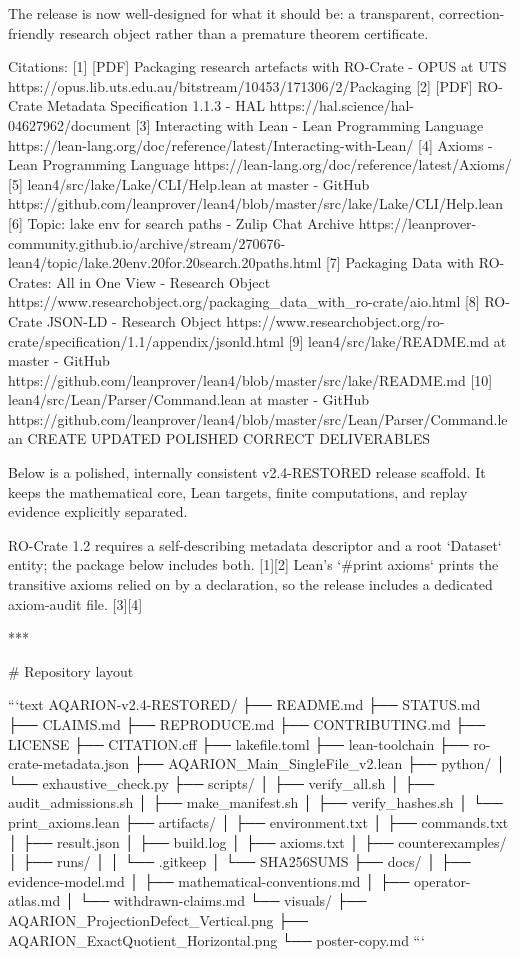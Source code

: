 The release is now well-designed for what it should be: a transparent, correction-friendly research object rather than a premature theorem certificate.

Citations:
[1] [PDF] Packaging research artefacts with RO-Crate - OPUS at UTS https://opus.lib.uts.edu.au/bitstream/10453/171306/2/Packaging%
[2] [PDF] RO-Crate Metadata Specification 1.1.3 - HAL https://hal.science/hal-04627962/document
[3] Interacting with Lean - Lean Programming Language https://lean-lang.org/doc/reference/latest/Interacting-with-Lean/
[4] Axioms - Lean Programming Language https://lean-lang.org/doc/reference/latest/Axioms/
[5] lean4/src/lake/Lake/CLI/Help.lean at master - GitHub https://github.com/leanprover/lean4/blob/master/src/lake/Lake/CLI/Help.lean
[6] Topic: lake env for search paths - Zulip Chat Archive https://leanprover-community.github.io/archive/stream/270676-lean4/topic/lake.20env.20for.20search.20paths.html
[7] Packaging Data with RO-Crates: All in One View - Research Object https://www.researchobject.org/packaging_data_with_ro-crate/aio.html
[8] RO-Crate JSON-LD - Research Object https://www.researchobject.org/ro-crate/specification/1.1/appendix/jsonld.html
[9] lean4/src/lake/README.md at master - GitHub https://github.com/leanprover/lean4/blob/master/src/lake/README.md
[10] lean4/src/Lean/Parser/Command.lean at master - GitHub https://github.com/leanprover/lean4/blob/master/src/Lean/Parser/Command.lean
CREATE UPDATED POLISHED CORRECT DELIVERABLES

Below is a polished, internally consistent v2.4-RESTORED release scaffold. It keeps the mathematical core, Lean targets, finite computations, and replay evidence explicitly separated.

RO-Crate 1.2 requires a self-describing metadata descriptor and a root `Dataset` entity; the package below includes both. [1][2] Lean’s `#print axioms` prints the transitive axioms relied on by a declaration, so the release includes a dedicated axiom-audit file. [3][4]

***

# Repository layout

```text
AQARION-v2.4-RESTORED/
├── README.md
├── STATUS.md
├── CLAIMS.md
├── REPRODUCE.md
├── CONTRIBUTING.md
├── LICENSE
├── CITATION.cff
├── lakefile.toml
├── lean-toolchain
├── ro-crate-metadata.json
├── AQARION_Main_SingleFile_v2.lean
├── python/
│   └── exhaustive_check.py
├── scripts/
│   ├── verify_all.sh
│   ├── audit_admissions.sh
│   ├── make_manifest.sh
│   ├── verify_hashes.sh
│   └── print_axioms.lean
├── artifacts/
│   ├── environment.txt
│   ├── commands.txt
│   ├── result.json
│   ├── build.log
│   ├── axioms.txt
│   ├── counterexamples/
│   ├── runs/
│   │   └── .gitkeep
│   └── SHA256SUMS
├── docs/
│   ├── evidence-model.md
│   ├── mathematical-conventions.md
│   ├── operator-atlas.md
│   └── withdrawn-claims.md
└── visuals/
    ├── AQARION_ProjectionDefect_Vertical.png
    ├── AQARION_ExactQuotient_Horizontal.png
    └── poster-copy.md
```

